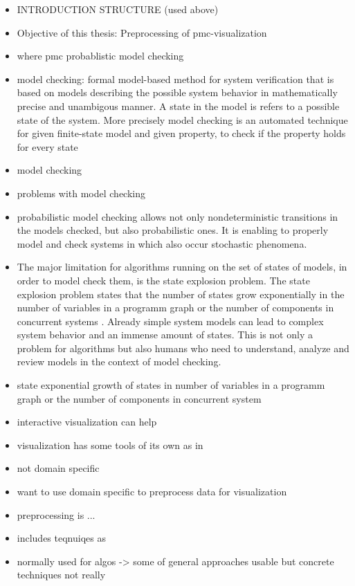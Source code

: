 \documentclass[preview]{standalone}
\begin{document}
\begin{itemize}
	\item INTRODUCTION STRUCTURE (used above)
	\item Objective of this thesis: Preprocessing of pmc-visualization
	\item where pmc probablistic model checking
	\item model checking: formal model-based method for system verification that is based on models describing the possible system behavior in mathematically precise and unambigous manner. A state in the model is refers to a possible state of the system. More precisely model checking is an automated technique for given finite-state model and given property, to check if the property holds for every state  \cite[chs. 1.1 and 1.2]{Baier2008}
	\item model checking
	\item problems with model checking
	\item probabilistic model checking allows not only nondeterministic transitions in the models checked, but also probabilistic ones. It is enabling to properly model and check systems in which also occur stochastic phenomena. 
	\item The major limitation for algorithms running on the set of states of models, in order to model check them, is the state explosion problem. The state explosion problem states that the number of states grow exponentially in the number of variables in a programm graph or the number of components in concurrent systems \cite[ch. 2.3]{Baier2008}. Already simple system models can lead to complex system behavior and an immense amount of states. This is not only a problem for algorithms but also humans who need to understand, analyze and review models in the context of model checking.
	\item state exponential growth of states in number of variables in a programm graph or the number of components in concurrent system \cite[ch. 2.3]{Baier2008}
	\item interactive visualization can help
	\item visualization has some tools of its own as in 
	\item not domain specific 
	\item want to use domain specific to preprocess data for visualization
	\item preprocessing is ... 
	\item includes teqnuiqes as
	\item normally used for algos -> some of general approaches usable but concrete techniques not really

\end{itemize}
\end{document}
